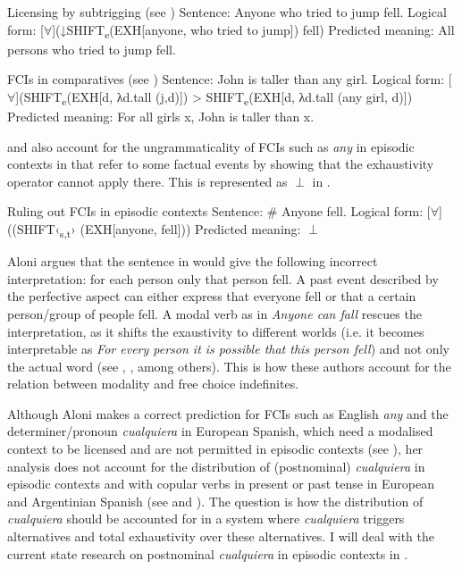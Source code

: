 \ea %
\label{bkm:Ref54857683}   {Licensing by subtrigging (see \citealt{Aloni2007})}
\ea  Sentence: Anyone who tried to jump fell.
\ex Logical form: [${\forall}$](↓\textsc{SHIFT}\textsubscript{e}({EXH}[anyone, who tried to jump]) fell)
\ex Predicted meaning: All persons who tried to jump fell.
\z
\z


\ea %
\label{bkm:Ref54857674}   {FCIs in comparatives (see \citealt{Aloni2021})}
\ea  Sentence: John is taller than any girl.
\ex Logical form: [${\forall}$](\textsc{SHIFT}\textsubscript{e}({EXH}[d, λd.tall (j,d)]) > \textsc{SHIFT}\textsubscript{e}({EXH}[d, λd.tall (any girl, d)])
\ex Predicted meaning: For all girls x, John is taller than x.

    \citep{AloniEtAl2011}
\z
\z

\citet{Aloni2007,Aloni2021} and \citet{AloniEtAl2010} also account for the ungrammaticality of FCIs such as \textit{any} in episodic contexts in  that refer to some factual events by showing that the exhaustivity operator cannot apply there. This is represented as  $\perp$ %
in .

\ea %
\label{bkm:Ref517204}   {Ruling out FCIs in episodic contexts}
\ea  Sentence: \# Anyone fell.
\ex Logical form: [${\forall}$]((\textsc{SHIFT}‹\textsubscript{s,t}› ({EXH}[anyone, fell]))
\ex Predicted meaning: $\perp$%

    \citep{Aloni2021}
\z
\z

Aloni argues that the sentence in  would give the following incorrect interpretation: for each person only that person fell. A past event described by the perfective aspect can either express that everyone fell or that a certain person/group of people fell. A modal verb as in \textit{Anyone can fall} rescues the interpretation, as it shifts the exaustivity to different worlds (i.e. it becomes interpretable as \textit{For every person it is possible that this person fell}) and not only the actual word (see \citealt{Menéndez-Benito2010}, \citealt{Aloni2021}, among others). This is how these authors account for the relation between modality and free choice indefinites.

Although Aloni makes a correct prediction for FCIs such as English \textit{any} and the determiner/pronoun \textit{cualquiera} in European Spanish, which need a modalised context to be licensed and are not permitted in episodic contexts (see ), her analysis does not account for the distribution of (postnominal) \textit{cualquiera} in episodic contexts and with copular verbs in present or past tense in European and Argentinian Spanish (see  and ). The question is how the distribution of \textit{cualquiera} should be accounted for in a system where \textit{cualquiera} triggers alternatives and total exhaustivity over these alternatives. I will deal with the current state research on postnominal \textit{cualquiera} in episodic contexts in .

